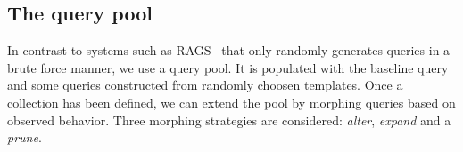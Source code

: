 \documentclass{cidr-2019}
\begin{document}
\subsection{The query pool}\label{morphing}
In contrast to systems such as RAGS~\cite{DBLP:conf/vldb/Slutz98} that
only randomly generates queries in a brute force manner, we use a
query pool. It is populated with the baseline query and some queries
constructed from randomly choosen templates. Once a collection has
been defined, we can extend the pool by morphing queries based on
observed behavior. Three morphing strategies are considered:
\emph{alter}, \emph{expand} and a \emph{prune}.

\end{document}
